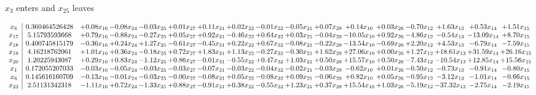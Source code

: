 \documentclass[9pt]{article}
\begin{document}
 $ x_{3} $ enters and $ x_{25} $ leaves 

 \[\begin{array}{c| c c@{\hskip 2pt} c@{\hskip 2pt} c@{\hskip 2pt} c@{\hskip 2pt} c@{\hskip 2pt} c@{\hskip 2pt} c@{\hskip 2pt} c@{\hskip 2pt} c@{\hskip 2pt} c@{\hskip 2pt} c@{\hskip 2pt} c@{\hskip 2pt} c@{\hskip 2pt} c@{\hskip 2pt} c@{\hskip 2pt} }
 x_{8}   &  0.360464526428 & +  0.08 x_{16} & -0.08 x_{24} & -0.03 x_{25} & +  0.01 x_{27} & +  0.11 x_{31} & +  0.02 x_{22} & -0.01 x_{32} & -0.05 x_{21} & +  0.07 x_{29} & +  0.14 x_{10} & +  0.03 x_{26} & -0.70 x_{12} & +  1.63 x_{13} & +  0.53 x_{14} & +  1.51 x_{15}\\
 x_{17}   &  5.15793593668 & +  0.79 x_{16} & -0.88 x_{24} & -0.27 x_{25} & +  0.05 x_{27} & +  0.92 x_{31} & -0.46 x_{22} & +  0.64 x_{32} & +  0.03 x_{21} & -0.04 x_{29} & -10.05 x_{10} & +  0.92 x_{26} & -4.86 x_{12} & -0.54 x_{13} & -13.09 x_{14} & +  8.70 x_{15}\\
 x_{18}   &  0.400745815179 & -0.36 x_{16} & +  0.24 x_{24} & +  1.27 x_{25} & -0.61 x_{27} & -0.45 x_{31} & +  0.22 x_{22} & +  0.67 x_{32} & -0.08 x_{21} & -0.22 x_{29} & -13.54 x_{10} & -0.69 x_{26} & +  2.20 x_{12} & +  4.53 x_{13} & -6.79 x_{14} & -7.59 x_{15}\\
 x_{19}   &  4.16218762061 & +  1.01 x_{16} & +  0.36 x_{24} & -0.18 x_{25} & +  0.72 x_{27} & +  1.83 x_{31} & +  1.13 x_{22} & -0.27 x_{32} & -0.30 x_{21} & +  1.62 x_{29} & + 27.06 x_{10} & +  0.00 x_{26} & +  1.27 x_{12} & + 18.61 x_{13} & + 31.59 x_{14} & + 26.16 x_{15}\\
 x_{20}   &  1.20225943087 & +  0.29 x_{16} & +  0.83 x_{24} & -1.12 x_{25} & +  0.86 x_{27} & -0.01 x_{31} & -0.55 x_{22} & +  0.47 x_{32} & +  1.03 x_{21} & +  0.50 x_{29} & + 15.57 x_{10} & +  0.50 x_{26} & -7.43 x_{12} & -10.54 x_{13} & + 12.85 x_{14} & + 15.56 x_{15}\\
 x_{1}   &  0.172055207033 & -0.03 x_{16} & -0.05 x_{24} & -0.03 x_{25} & -0.03 x_{27} & -0.07 x_{31} & -0.03 x_{22} & -0.04 x_{32} & -0.02 x_{21} & -0.03 x_{29} & -0.62 x_{10} & +  0.01 x_{26} & -0.50 x_{12} & -0.73 x_{13} & -0.91 x_{14} & -0.80 x_{15}\\
 x_{6}   &  0.145616160709 & -0.13 x_{16} & -0.01 x_{24} & -0.03 x_{25} & -0.00 x_{27} & -0.08 x_{31} & +  0.05 x_{22} & -0.08 x_{32} & +  0.09 x_{21} & -0.06 x_{29} & +  0.82 x_{10} & +  0.05 x_{26} & -0.95 x_{12} & -3.12 x_{13} & -1.01 x_{14} & -0.66 x_{15}\\
 x_{23}   &  2.51131342318 & -1.11 x_{16} & +  0.72 x_{24} & -1.33 x_{25} & +  0.88 x_{27} & -0.91 x_{31} & +  0.38 x_{22} & -0.55 x_{32} & +  1.23 x_{21} & +  0.37 x_{29} & + 15.54 x_{10} & +  1.03 x_{26} & -5.19 x_{12} & -37.32 x_{13} & -2.75 x_{14} & -2.19 x_{15}\\

\end{array}\]
\end{document}
